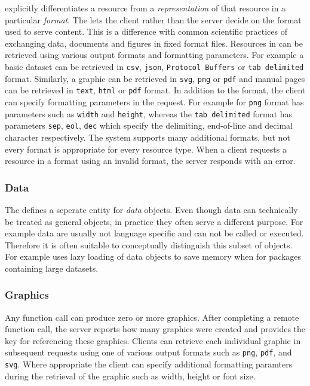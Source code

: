 \OpenCPU explicitly differentiates a resource from a \emph{representation} of that resource in a particular \emph{format}. The \API lets the client rather than the server decide on the format used to serve content. This is a difference with common scientific practices of exchanging data, documents and figures in fixed format files. Resources in \OpenCPU can be retrieved using various output formats and formatting parameters. For example a basic dataset can be retrieved in \texttt{csv}, \texttt{json}, \texttt{Protocol Buffers} or \texttt{tab delimited} format. Similarly, a graphic can be retrieved in \texttt{svg}, \texttt{png} or \texttt{pdf} and manual pages can be retrieved in \texttt{text}, \texttt{html} or \texttt{pdf} format. In addition to the format, the client can specify formatting parameters in the request. For example for \texttt{png} format has parameters such as \texttt{width} and \texttt{height}, whereas the \texttt{tab delimited} format has parameters \texttt{sep}, \texttt{eol}, \texttt{dec} which specify the delimiting, end-of-line and decimal character respectively. The system supports many additional formats, but not every format is appropriate for every resource type. When a client requests a resource in a format using an invalid format, the server responds with an error. 

\subsubsection{Data}

The \API defines a seperate entity for \emph{data} objects. Even though data can technically be treated as general objects, in practice they often serve a different purpose. For example data are usually not language specific and can not be called or executed. Therefore it is often suitable to conceptually distinguish this subset of objects. For example \R uses lazy loading of data objects to save memory when for packages containing large datasets.



\subsubsection{Graphics}

Any function call can produce zero or more graphics. After completing a remote function call, the server reports how many graphics were created and provides the key for referencing these graphics. Clients can retrieve each individual graphic in subsequent requests using one of various output formats such as \texttt{png}, \texttt{pdf}, and \texttt{svg}. Where appropriate the client can specify additional formatting paramters during the retrieval of the graphic such as width, height or font size.


